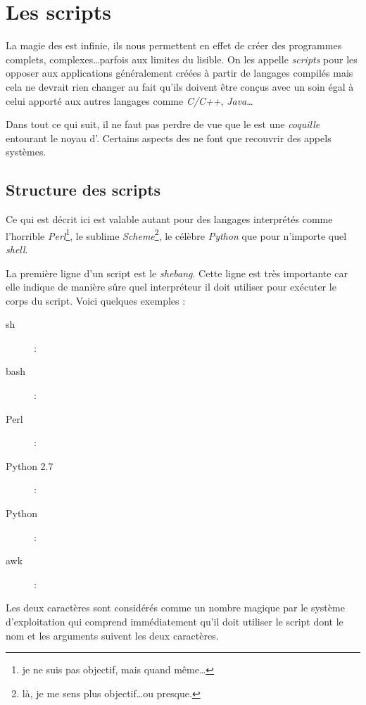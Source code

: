 
\section{Les scripts \shell}
La magie des \shells est infinie, ils nous permettent en effet de créer des programmes complets, complexes\ldots parfois aux limites du lisible. On les appelle \emph{scripts} pour les opposer aux applications généralement créées à partir de langages compilés mais cela ne devrait rien changer au fait qu'ils doivent être conçus avec un soin égal à celui apporté aux autres langages comme \emph{C/C++}, \emph{Java}\ldots

Dans tout ce qui suit, il ne faut pas perdre de vue que le \shell est une \emph{coquille} entourant le noyau d'\unix. Certains aspects des \shells ne font que recouvrir des appels systèmes.

\subsection{Structure des scripts}
Ce qui est décrit ici est valable autant pour des langages interprétés comme l'horrible \emph{Perl}\footnote{je ne suis pas objectif, mais quand même\ldots}, le sublime \emph{Scheme}\footnote{là, je me sens plus objectif\ldots ou presque.}, le célèbre \emph{Python} que pour n'importe quel \emph{shell}.

La première ligne d'un script est le \emph{shebang}. Cette ligne est très importante car elle indique de manière sûre quel interpréteur il doit utiliser pour exécuter le corps du script. Voici quelques exemples :

\begin{description}
\item[sh] : 
\item[bash] : 
\item[Perl] : 
\item[Python 2.7] : 
\item[Python] : 
\item[awk] : 
\end{description}

Les deux caractères \code{\#!} sont considérés comme un nombre magique par le système d'exploitation qui comprend immédiatement qu'il doit utiliser le script dont le nom et les arguments suivent les deux caractères.

